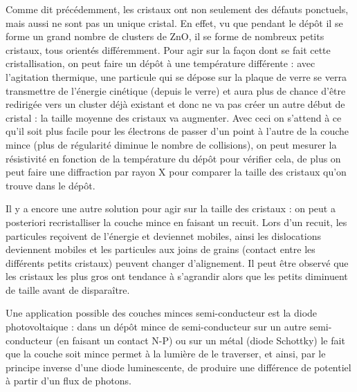 \documentclass[a4paper,12pt,oneside]{article}
\begin{document}
Comme dit précédemment, les cristaux ont non seulement des défauts ponctuels, mais aussi ne sont pas un unique cristal. En effet, vu que pendant le dépôt il se forme un grand nombre de clusters de ZnO, il se forme de nombreux petits cristaux, tous orientés différemment. Pour agir sur la façon dont se fait cette cristallisation, on peut faire un dépôt à une température différente : avec l'agitation thermique, une particule qui se dépose sur la plaque de verre se verra transmettre de l'énergie cinétique (depuis le verre) et aura plus de chance d'être redirigée vers un cluster déjà existant et donc ne va pas créer un autre début de cristal : la taille moyenne des cristaux va augmenter. Avec ceci on s'attend à ce qu'il soit plus facile pour les électrons de passer d'un point à l'autre de la couche mince (plus de régularité diminue le nombre de collisions), on peut mesurer la résistivité en fonction de la température du dépôt pour vérifier cela, de plus on peut faire une diffraction par rayon X pour comparer la taille des cristaux qu'on trouve dans le dépôt.

Il y a encore une autre solution pour agir sur la taille des cristaux : on peut a posteriori recristalliser la couche mince en faisant un recuit. Lors d'un recuit, les particules reçoivent de l'énergie et deviennet mobiles, ainsi les dislocations deviennent mobiles et les particules aux joins de grains (contact entre les différents petits cristaux) peuvent changer d'alignement. Il peut être observé que les cristaux les plus gros ont tendance à s'agrandir alors que les petits diminuent de taille avant de disparaître. 







Une application possible des couches minces semi-conducteur est la diode photovoltaique : dans un dépôt mince de semi-conducteur sur un autre semi-conducteur (en faisant un contact N-P) ou sur un métal (diode Schottky) le fait que la couche soit mince permet à la lumière de le traverser, et ainsi, par le principe inverse d'une diode luminescente, de produire une différence de potentiel à partir d'un flux de photons. 
\end{document}
